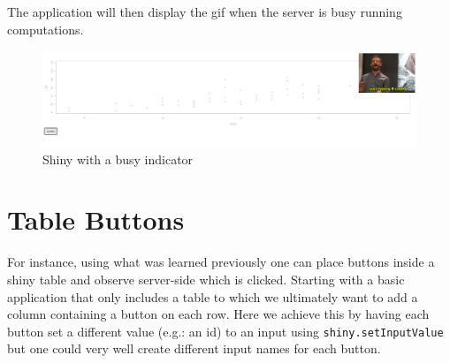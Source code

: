 \documentclass[
]{krantz}
\makeatletter
\newenvironment{Shaded}{\begin{snugshade}}{\end{snugshade}}
\newcommand{\ControlFlowTok}[1]{\textcolor[rgb]{0.27,0.27,0.27}{\textbf{#1}}}
\newcommand{\DataTypeTok}[1]{\textcolor[rgb]{0.27,0.27,0.27}{#1}}
\newcommand{\KeywordTok}[1]{\textcolor[rgb]{0.27,0.27,0.27}{\textbf{#1}}}
\newcommand{\NormalTok}[1]{#1}
\newcommand{\OperatorTok}[1]{\textcolor[rgb]{0.43,0.43,0.43}{\textbf{#1}}}
\newcommand{\OtherTok}[1]{\textcolor[rgb]{0.37,0.37,0.37}{#1}}
\newcommand{\StringTok}[1]{\textcolor[rgb]{0.5,0.5,0.5}{#1}}
\newenvironment{kframe}{%
\medskip{}
\setlength{\fboxsep}{.8em}
 \def\at@end@of@kframe{}%
 \ifinner\ifhmode%
  \def\at@end@of@kframe{\end{minipage}}%
  \begin{minipage}{\columnwidth}%
 \fi\fi%
 \def\FrameCommand##1{\hskip\@totalleftmargin \hskip-\fboxsep
 \colorbox{shadecolor}{##1}\hskip-\fboxsep
     \hskip-\linewidth \hskip-\@totalleftmargin \hskip\columnwidth}%
 \MakeFramed {\advance\hsize-\width
   \@totalleftmargin\z@ \linewidth\hsize
   \@setminipage}}%
 {\par\unskip\endMakeFramed%
 \at@end@of@kframe}
\renewenvironment{Shaded}{\begin{kframe}}{\end{kframe}}
\makeatother
\begin{document}
The application will then display the gif when the server is busy running computations.

\begin{figure}
\centering
\includegraphics{images/shiny-events.png}
\caption{Shiny with a busy indicator}
\end{figure}

\hypertarget{table-buttons}{%
\section{Table Buttons}\label{table-buttons}}

For instance, using what was learned previously one can place buttons inside a shiny table and observe server-side which is clicked. Starting with a basic application that only includes a table to which we ultimately want to add a column containing a button on each row. Here we achieve this by having each button set a different value (e.g.: an id) to an input using \texttt{shiny.setInputValue} but one could very well create different input names for each button.

\begin{Shaded}
\end{Shaded}
\end{document}
